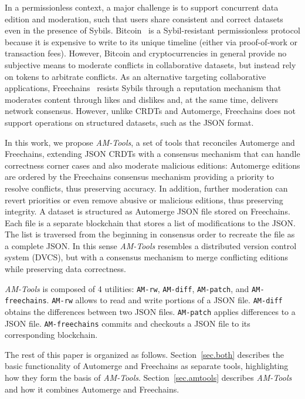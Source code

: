 \documentclass[12pt]{article}
\newcommand{\AMT}      {\emph{AM-Tools}\xspace}
\newcommand{\code}[1]  {\texttt{\footnotesize{#1}}}
\begin{document}
In a permissionless context, a major challenge is to support concurrent data
edition and moderation, such that users share consistent and correct datasets
even in the presence of Sybils.
%
Bitcoin~\cite{nakamoto2008bitcoin} is a Sybil-resistant permissionless protocol
because it is expensive to write to its unique timeline (either via
proof-of-work or transaction fees).
However, Bitcoin and cryptocurrencies in general provide no subjective means to
moderate conflicts in collaborative datasets, but instead rely on tokens to
arbitrate conflicts.
%
As an alternative targeting collaborative applications,
Freechains~\cite{sant2020freechains} resists Sybils through a reputation
mechanism that moderates content through likes and dislikes and, at the same
time, delivers network consensus.
However, unlike CRDTs and Automerge, Freechains does not support operations on
structured datasets, such as the JSON format.

In this work, we propose \AMT, a set of tools that reconciles Automerge and
Freechains, extending JSON CRDTs with a consensus mechanism that can handle
correctness corner cases and also moderate malicious editions:
Automerge editions are ordered by the Freechains consensus mechanism providing
a priority to resolve conflicts, thus preserving accuracy.
In addition, further moderation can revert priorities or even remove abusive or
malicious editions, thus preserving integrity.
%
A dataset is structured as Automerge JSON file stored on Freechains.
Each file is a separate blockchain that stores a list of modifications to the
JSON.
The list is traversed from the beginning in consensus order to recreate the
file as a complete JSON.
%
In this sense \AMT resembles a distributed version control system (DVCS), but
with a consensus mechanism to merge conflicting editions while
preserving data correctness.

\AMT is composed of 4 utilities: \code{AM-rw}, \code{AM-diff}, \code{AM-patch},
and \code{AM-freechains}.
%
\code{AM-rw} allows to read and write portions of a JSON file.
\code{AM-diff} obtains the differences between two JSON files.
\code{AM-patch} applies differences to a JSON file.
\code{AM-freechains} commits and checkouts a JSON file to its corresponding
blockchain.

The rest of this paper is organized as follows.
Section~\ref{sec.both} describes the basic functionality of Automerge and
Freechains as separate tools, highlighting how they form the basis of
\AMT.
Section~\ref{sec.amtools} describes \AMT and how it combines Automerge and
Freechains.
\end{document}
